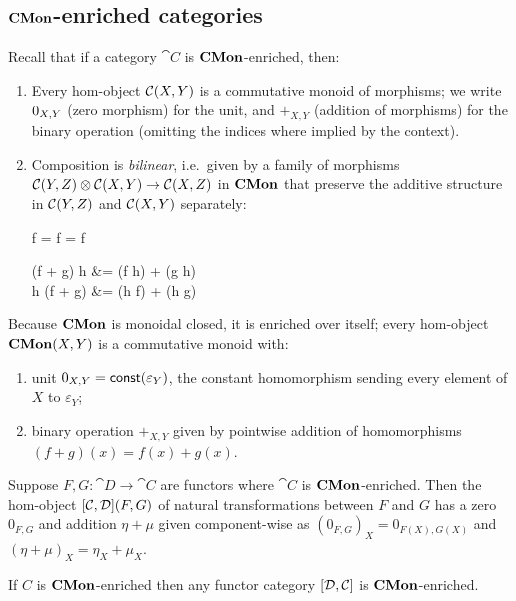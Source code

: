 \subsection{$\mathbf{CMon}$-enriched categories}
\label{sec:cmon-enriched}

Recall that if a category $\cat{C}$ is $\mathbf{CMon}$-enriched, then:
\begin{enumerate}
\item Every hom-object ${\mathcal{C}}(X,Y)$ is a commutative monoid of morphisms; we write $0_{X,Y}$
(zero morphism) for the unit, and $+_{X,Y}$ (addition of morphisms) for the binary operation (omitting the
indices where implied by the context).
\item Composition is \emph{bilinear}, i.e.~given by a family of morphisms ${\mathcal{C}}(Y,Z) \otimes
{\mathcal{C}}(X,Y) \to {\mathcal{C}}(X,Z)$ in $\mathbf{CMon}$ that preserve the additive structure in
${\mathcal{C}}(Y,Z)$ and ${\mathcal{C}}(X,Y)$ separately:

\begin{salign*}
f \comp \zero = f = \zero \comp f
\end{salign*}
\begin{salign*}
(f + g) \comp h &= (f \comp h) + (g \comp h) \\
h \comp (f + g) &= (h \comp f) + (h \comp g)
\end{salign*}
\end{enumerate}

Because $\mathbf{CMon}$ is monoidal closed, it is enriched over itself; every hom-object ${\mathbf{CMon}}(X,Y)$ is a
commutative monoid with:

\begin{enumerate}
\item unit $0_{X,Y} = \mathsf{const}(\varepsilon_Y)$, the constant homomorphism sending every element of $X$ to
$\varepsilon_Y$;
\item binary operation $+_{X,Y}$ given by pointwise addition of homomorphisms $(f + g)(x) = f(x) + g(x)$.
\end{enumerate}

Suppose $F, G: \cat{D} \to \cat{C}$ are functors where $\cat{C}$ is $\mathbf{CMon}$-enriched. Then the hom-object
${[\mathcal{C},\mathcal{D}]}(F,G)$ of natural transformations between $F$ and $G$ has a zero $0_{F,G}$ and
addition $\eta + \mu$ given component-wise as $(0_{F,G})_X = 0_{F(X),G(X)}$ and $(\eta + \mu)_X = \eta_X +
\mu_X$.

\begin{proposition}
If $C$ is $\mathbf{CMon}$-enriched then any functor category $[\mathcal{D},\mathcal{C}]$ is $\mathbf{CMon}$-enriched.
\end{proposition}

